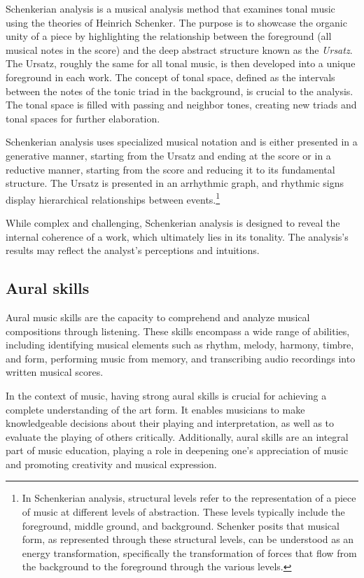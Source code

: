 Schenkerian analysis is a musical analysis method that examines tonal music using the theories of Heinrich Schenker. The purpose is to showcase the organic unity of a piece by highlighting the relationship between the foreground (all musical notes in the score) and the deep abstract structure known as the \textit{Ursatz}. The Ursatz, roughly the same for all tonal music, is then developed into a unique foreground in each work. The concept of tonal space, defined as the intervals between the notes of the tonic triad in the background, is crucial to the analysis. The tonal space is filled with passing and neighbor tones, creating new triads and tonal spaces for further elaboration.

Schenkerian analysis uses specialized musical notation and is either presented in a generative manner, starting from the Ursatz and ending at the score or in a reductive manner, starting from the score and reducing it to its fundamental structure. The Ursatz is presented in an arrhythmic graph, and rhythmic signs display hierarchical relationships between events.\footnote{In Schenkerian analysis, structural levels refer to the representation of a piece of music at different levels of abstraction. These levels typically include the foreground, middle ground, and background. Schenker posits that musical form, as represented through these structural levels, can be understood as an energy transformation, specifically the transformation of forces that flow from the background to the foreground through the various levels.}

While complex and challenging, Schenkerian analysis is designed to reveal the internal coherence of a work, which ultimately lies in its tonality. The analysis's results may reflect the analyst's perceptions and intuitions.

\subsection{Aural skills}

Aural music skills are the capacity to comprehend and analyze musical compositions through listening. These skills encompass a wide range of abilities, including identifying musical elements such as rhythm, melody, harmony, timbre, and form, performing music from memory, and transcribing audio recordings into written musical scores.

In the context of music, having strong aural skills is crucial for achieving a complete understanding of the art form. It enables musicians to make knowledgeable decisions about their playing and interpretation, as well as to evaluate the playing of others critically. Additionally, aural skills are an integral part of music education, playing a role in deepening one's appreciation of music and promoting creativity and musical expression.

